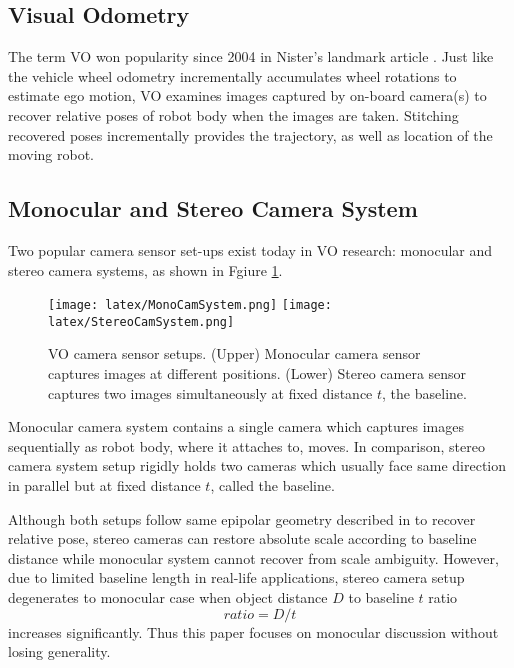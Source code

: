 \documentclass[10pt,twocolumn,letterpaper]{article}
\begin{document}
\subsection{Visual Odometry}

The term VO won popularity since 2004 in Nister's landmark article \cite{Nistr2004VisualO}. Just like the vehicle wheel odometry incrementally accumulates wheel rotations to estimate ego motion, VO examines images captured by on-board camera(s) to recover relative poses of robot body when the images are taken. Stitching recovered poses incrementally provides the trajectory, as well as location of the moving robot. 

\subsection{Monocular and Stereo Camera System}

Two popular camera sensor set-ups exist today in VO research: monocular and stereo camera systems, as shown in Fgiure \ref{fig:VOSensorSetup}.


\begin{figure}[t]
\centering
\texttt{[image: latex/MonoCamSystem.png]} 
\texttt{[image: latex/StereoCamSystem.png]}

\caption{VO camera sensor setups. (Upper) Monocular camera sensor captures images at different positions. (Lower) Stereo camera sensor captures two images simultaneously at fixed distance $t$, the baseline.}
\label{fig:VOSensorSetup}
\end{figure}
 
Monocular camera system contains a single camera which captures images sequentially as robot body, where it attaches to, moves. In comparison, stereo camera system setup rigidly holds two cameras which usually face same direction in parallel but at fixed distance $t$, called the baseline. 

Although both setups follow same epipolar geometry described in \cite{Hartley2004} to recover relative pose, stereo cameras can restore absolute scale according to baseline distance while monocular system cannot recover from scale ambiguity. However, due to limited baseline length in real-life applications, stereo camera setup degenerates to monocular case when object distance $D$ to baseline $t$ ratio 
\begin{equation} \label{eq:1}
ratio=D/t
\end{equation}
increases significantly. Thus this paper focuses on monocular discussion without losing generality. 
\end{document}
